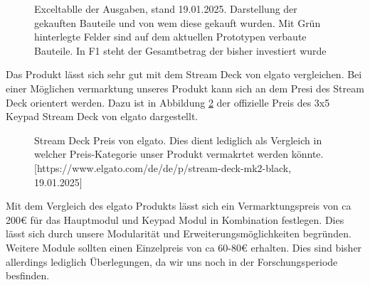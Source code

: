 \begin{figure}[H]
    \centering    
    \caption{Exceltablle der Ausgaben, stand 19.01.2025. Darstellung der gekauften Bauteile und von wem diese gekauft wurden. Mit Grün hinterlegte Felder sind auf dem aktuellen Prototypen verbaute Bauteile. In F1 steht der Gesamtbetrag der bisher investiert wurde}
    \label{Finanzen}
\end{figure}

Das Produkt lässt sich sehr gut mit dem Stream Deck von elgato vergleichen. Bei einer Möglichen vermarktung unseres Produkt kann sich an dem Presi des Stream Deck orientert werden. Dazu ist in Abbildung \ref{streamDeck} der offizielle Preis des 3x5 Keypad Stream Deck von elgato dargestellt.

\begin{figure}[H]
    \centering    
    \caption{Stream Deck Preis von elgato. Dies dient lediglich als Vergleich in welcher Preis-Kategorie unser Produkt vermakrtet werden könnte. [https://www.elgato.com/de/de/p/stream-deck-mk2-black, 19.01.2025]}
    \label{streamDeck}
\end{figure}

Mit dem Vergleich des elgato Produkts lässt sich ein Vermarktungspreis von ca 200€ für das Hauptmodul und Keypad Modul in Kombination festlegen. Dies lässt sich durch unsere Modularität und Erweiterungsmöglichkeiten begründen. Weitere Module sollten einen Einzelpreis von ca 60-80€ erhalten.
Dies sind bisher allerdings lediglich Überlegungen, da wir uns noch in der Forschungsperiode besfinden.

